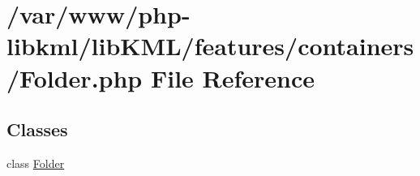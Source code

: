 \hypertarget{Folder_8php}{
\section{/var/www/php-\/libkml/libKML/features/containers/Folder.php File Reference}
\label{d1/d47/Folder_8php}
}
\subsection*{Classes}
\begin{DoxyCompactItemize}
\item 
class \hyperlink{classFolder}{Folder}
\end{DoxyCompactItemize}
